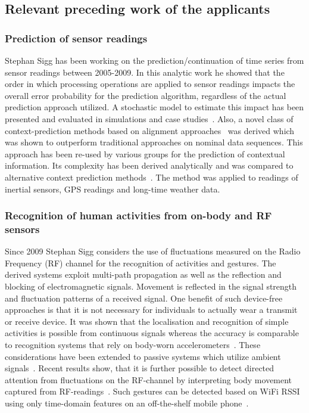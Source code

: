 \documentclass[12pt]{article}
\begin{document}
\subsection*{Relevant preceding work of the applicants}
\subsubsection*{Prediction of sensor readings}
Stephan Sigg has been working on the prediction/continuation of time series from sensor readings between 2005-2009.
In this analytic work he showed that the order in which processing operations are applied to sensor readings impacts the overall error probability for the prediction algorithm, regardless of the actual prediction approach utilized.
A stochastic model to estimate this impact has been presented and evaluated in simulations and case studies~\cite{4027}. 
Also, a novel class of context-prediction methods based on alignment approaches~\cite{4026} was derived which was shown to outperform traditional approaches on nominal data sequences. 
This approach has been re-used by various groups for the prediction of contextual information.
Its complexity has been derived analytically and was compared to alternative context prediction methods~\cite{4027}. 
The method was applied to readings of inertial sensors, GPS readings and long-time weather data. 

\subsubsection*{Recognition of human activities from on-body and RF sensors}
Since 2009 Stephan Sigg considers the use of fluctuations measured on the Radio Frequency (RF) channel for the recognition of activities and gestures.
The derived systems exploit multi-path propagation as well as the reflection and blocking of electromagnetic signals.
Movement is reflected in the signal strength and fluctuation patterns of a received signal.
One benefit of such device-free approaches is that it is not necessary for individuals to actually wear a transmit or receive device.
It was shown that the localisation and recognition of simple activities is possible from continuous signals whereas the accuracy is comparable to recognition systems that rely on body-worn accelerometers~\cite{Pervasive_Sigg_2012}. 
These considerations have been extended to passive systems which utilize ambient signals~\cite{Pervasive_Sigg_2013}.
Recent results show, that it is further possible to detect directed attention from fluctuations on the RF-channel by interpreting body movement captured from RF-readings~\cite{Pervasive_Shi_2014}.
Such gestures can be detected based on WiFi RSSI using only time-domain features on an off-the-shelf mobile phone~\cite{RFSensing_Sigg_2014}.
\end{document}
